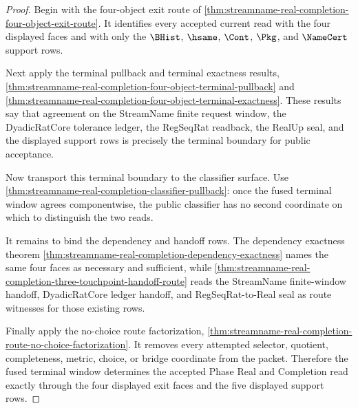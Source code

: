 \begin{proof}
Begin with the four-object exit route of \autoref{thm:streamname-real-completion-four-object-exit-route}. It identifies every accepted current read with the four displayed faces and with only the $\BHist$, $\hsame$, $\Cont$, $\Pkg$, and $\NameCert$ support rows.

Next apply the terminal pullback and terminal exactness results, \autoref{thm:streamname-real-completion-four-object-terminal-pullback} and \autoref{thm:streamname-real-completion-four-object-terminal-exactness}. These results say that agreement on the StreamName finite request window, the DyadicRatCore tolerance ledger, the RegSeqRat readback, the RealUp seal, and the displayed support rows is precisely the terminal boundary for public acceptance.

Now transport this terminal boundary to the classifier surface. Use \autoref{thm:streamname-real-completion-classifier-pullback}: once the fused terminal window agrees componentwise, the public classifier has no second coordinate on which to distinguish the two reads.

It remains to bind the dependency and handoff rows. The dependency exactness theorem \autoref{thm:streamname-real-completion-dependency-exactness} names the same four faces as necessary and sufficient, while \autoref{thm:streamname-real-completion-three-touchpoint-handoff-route} reads the StreamName finite-window handoff, DyadicRatCore ledger handoff, and RegSeqRat-to-Real seal as route witnesses for those existing rows.

Finally apply the no-choice route factorization, \autoref{thm:streamname-real-completion-route-no-choice-factorization}. It removes every attempted selector, quotient, completeness, metric, choice, or bridge coordinate from the packet. Therefore the fused terminal window determines the accepted Phase Real and Completion read exactly through the four displayed exit faces and the five displayed support rows.
\end{proof}

